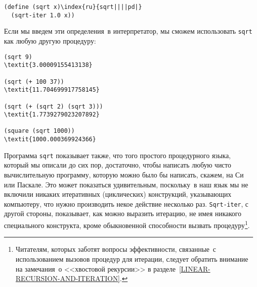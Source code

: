 \begin{Verbatim}[fontsize=\small]
(define (sqrt x)\index{ru}{sqrt||||pd|}
  (sqrt-iter 1.0 x))
\end{Verbatim}
Если мы введем эти определения~в интерпретатор, мы сможем использовать 
{\tt sqrt} как любую другую процедуру:

\begin{Verbatim}[fontsize=\small]
(sqrt 9)
\textit{3.00009155413138}

(sqrt (+ 100 37))
\textit{11.704699917758145}

(sqrt (+ (sqrt 2) (sqrt 3)))
\textit{1.7739279023207892}

(square (sqrt 1000))
\textit{1000.000369924366}
\end{Verbatim}

Программа {\tt sqrt} показывает также, что того
простого процедурного языка, который мы описали до сих пор,
достаточно, чтобы написать любую чисто вычислительную программу,
которую можно было бы написать, скажем, на Си или Паскале. Это может
показаться удивительным, поскольку~в наш язык мы не включили никаких
итеративных (циклических) конструкций, указывающих компьютеру,
что нужно производить некое действие несколько раз.  {\tt Sqrt-iter}, 
с другой стороны, показывает, как можно выразить итерацию, не имея
никакого специального конструкта, кроме обыкновенной способности
вызвать процедуру\footnote{Читателям, которых заботят вопросы эффективности,
связанные~с использованием вызовов процедур для итерации,
следует обратить внимание на замечания~о <<хвостовой рекурсии>> в
разделе~\ref{LINEAR-RECURSION-AND-ITERATION}.}.
